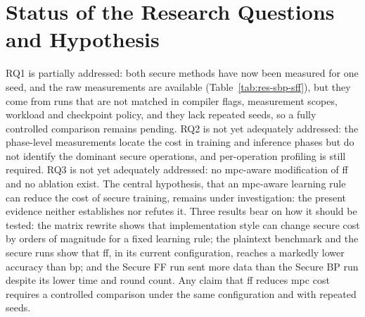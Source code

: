 \section{Status of the Research Questions and Hypothesis}\label{sec:disc-rq}
RQ1 is partially addressed: both secure methods have now been measured for one seed, and the raw measurements are available (Table~\ref{tab:res-sbp-sff}), but they come from runs that are not matched in compiler flags, measurement scopes, workload and checkpoint policy, and they lack repeated seeds, so a fully controlled comparison remains pending. RQ2 is not yet adequately addressed: the phase-level measurements locate the cost in training and inference phases but do not identify the dominant secure operations, and per-operation profiling is still required. RQ3 is not yet adequately addressed: no \ac{mpc}-aware modification of \ac{ff} and no ablation exist. The central hypothesis, that an \ac{mpc}-aware learning rule can reduce the cost of secure training, remains under investigation: the present evidence neither establishes nor refutes it. Three results bear on how it should be tested: the matrix rewrite shows that implementation style can change secure cost by orders of magnitude for a fixed learning rule; the plaintext benchmark and the secure runs show that \ac{ff}, in its current configuration, reaches a markedly lower accuracy than \ac{bp}; and the Secure FF run sent more data than the Secure BP run despite its lower time and round count. Any claim that \ac{ff} reduces \ac{mpc} cost requires a controlled comparison under the same configuration and with repeated seeds.

